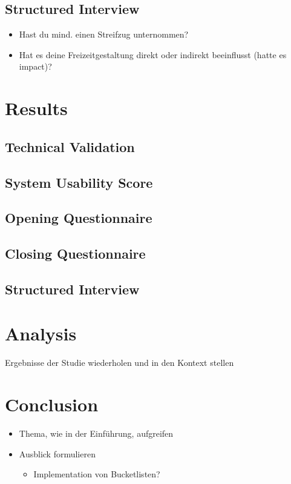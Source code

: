 \documentclass[12pt,numbers=noenddot,parskip,bibliography=totocnumbered,listof=totocnumbered]{scrreprt}
\begin{document}
\section{Structured Interview}
\begin{itemize} 
	\item Hast du mind. einen Streifzug unternommen?
	\item Hat es deine Freizeitgestaltung direkt oder indirekt beeinflusst (hatte es impact)?
\end{itemize}

\chapter{Results}

\section{Technical Validation}

\section{System Usability Score}

\section{Opening Questionnaire}

\section{Closing Questionnaire}

\section{Structured Interview}

\chapter{Analysis}
Ergebnisse der Studie wiederholen und in den Kontext stellen

\chapter{Conclusion}
\begin{itemize} 
	\item Thema, wie in der Einführung, aufgreifen
	\item Ausblick formulieren
	\begin{itemize} 
		\item Implementation von Bucketlisten?
	\end{itemize} 
\end{itemize} 
\end{document}
